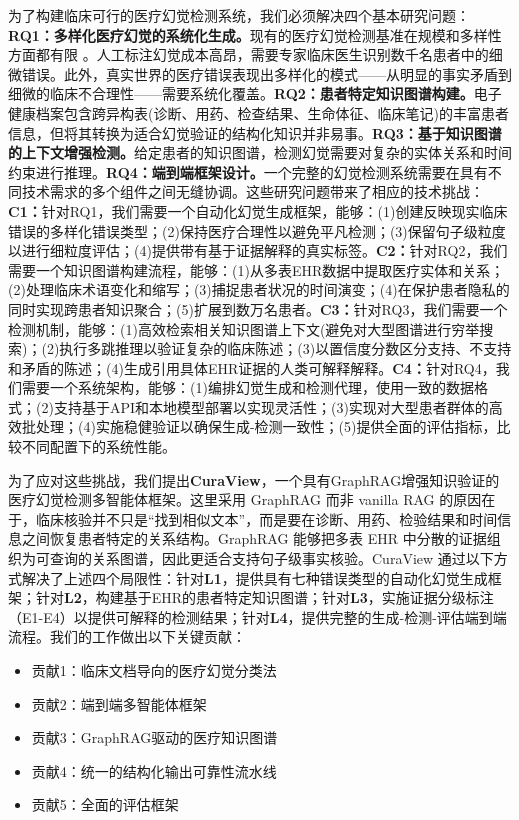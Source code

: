 \documentclass[11pt]{article}
\providecommand{\tightlist}{\setlength{\itemsep}{0pt}\setlength{\parskip}{0pt}}
\begin{document}
为了构建临床可行的医疗幻觉检测系统，我们必须解决四个基本研究问题：\textbf{RQ1：多样化医疗幻觉的系统化生成。}现有的医疗幻觉检测基准在规模和多样性方面都有限 \citep{pal2023medHalt}。人工标注幻觉成本高昂，需要专家临床医生识别数千名患者中的细微错误。此外，真实世界的医疗错误表现出多样化的模式------从明显的事实矛盾到细微的临床不合理性------需要系统化覆盖。\textbf{RQ2：患者特定知识图谱构建。}电子健康档案包含跨异构表(诊断、用药、检查结果、生命体征、临床笔记)的丰富患者信息，但将其转换为适合幻觉验证的结构化知识并非易事。\textbf{RQ3：基于知识图谱的上下文增强检测。}给定患者的知识图谱，检测幻觉需要对复杂的实体关系和时间约束进行推理。\textbf{RQ4：端到端框架设计。}一个完整的幻觉检测系统需要在具有不同技术需求的多个组件之间无缝协调。这些研究问题带来了相应的技术挑战：\textbf{C1：}针对RQ1，我们需要一个自动化幻觉生成框架，能够：(1)创建反映现实临床错误的多样化错误类型；(2)保持医疗合理性以避免平凡检测；(3)保留句子级粒度以进行细粒度评估；(4)提供带有基于证据解释的真实标签。\textbf{C2：}针对RQ2，我们需要一个知识图谱构建流程，能够：(1)从多表EHR数据中提取医疗实体和关系；(2)处理临床术语变化和缩写；(3)捕捉患者状况的时间演变；(4)在保护患者隐私的同时实现跨患者知识聚合；(5)扩展到数万名患者。\textbf{C3：}针对RQ3，我们需要一个检测机制，能够：(1)高效检索相关知识图谱上下文(避免对大型图谱进行穷举搜索)；(2)执行多跳推理以验证复杂的临床陈述；(3)以置信度分数区分支持、不支持和矛盾的陈述；(4)生成引用具体EHR证据的人类可解释解释。\textbf{C4：}针对RQ4，我们需要一个系统架构，能够：(1)编排幻觉生成和检测代理，使用一致的数据格式；(2)支持基于API和本地模型部署以实现灵活性；(3)实现对大型患者群体的高效批处理；(4)实施稳健验证以确保生成-检测一致性；(5)提供全面的评估指标，比较不同配置下的系统性能。

为了应对这些挑战，我们提出\textbf{CuraView}，一个具有GraphRAG增强知识验证的医疗幻觉检测多智能体框架。这里采用 GraphRAG 而非 vanilla RAG 的原因在于，临床核验并不只是``找到相似文本''，而是要在诊断、用药、检验结果和时间信息之间恢复患者特定的关系结构。GraphRAG 能够把多表 EHR 中分散的证据组织为可查询的关系图谱，因此更适合支持句子级事实核验。CuraView 通过以下方式解决了上述四个局限性：针对\textbf{L1}，提供具有七种错误类型的自动化幻觉生成框架；针对\textbf{L2}，构建基于EHR的患者特定知识图谱；针对\textbf{L3}，实施证据分级标注（E1-E4）以提供可解释的检测结果；针对\textbf{L4}，提供完整的生成-检测-评估端到端流程。我们的工作做出以下关键贡献：

\begin{itemize}
\tightlist
\item
  贡献1：临床文档导向的医疗幻觉分类法
\item
  贡献2：端到端多智能体框架
\item
  贡献3：GraphRAG驱动的医疗知识图谱
\item
  贡献4：统一的结构化输出可靠性流水线
\item
  贡献5：全面的评估框架
\end{itemize}
\end{document}
